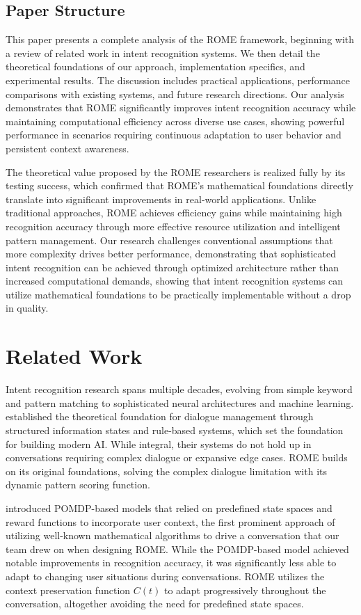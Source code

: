 \documentclass[12pt]{article}
\begin{document}
\subsection{Paper Structure}
This paper presents a complete analysis of the ROME framework, beginning with a review of related work in intent recognition systems. We then detail the theoretical foundations of our approach, implementation specifics, and experimental results. The discussion includes practical applications, performance comparisons with existing systems, and future research directions. Our analysis demonstrates that ROME significantly improves intent recognition accuracy while maintaining computational efficiency across diverse use cases, showing powerful performance in scenarios requiring continuous adaptation to user behavior and persistent context awareness.

The theoretical value proposed by the ROME researchers is realized fully by its testing success, which confirmed that ROME's mathematical foundations directly translate into significant improvements in real-world applications. Unlike traditional approaches, ROME achieves efficiency gains while maintaining high recognition accuracy through more effective resource utilization and intelligent pattern management. Our research challenges conventional assumptions that more complexity drives better performance, demonstrating that sophisticated intent recognition can be achieved through optimized architecture rather than increased computational demands, showing that intent recognition systems can utilize mathematical foundations to be practically implementable without a drop in quality.


\section{Related Work}
Intent recognition research spans multiple decades, evolving from simple keyword and pattern matching to sophisticated neural architectures and machine learning. \citet{larsson2000} established the theoretical foundation for dialogue management through structured information states and rule-based systems, which set the foundation for building modern AI. While integral, their systems do not hold up in conversations requiring complex dialogue or expansive edge cases. ROME builds on its original foundations, solving the complex dialogue limitation with its dynamic pattern scoring function.

\citet{young2013} introduced POMDP-based models that relied on predefined state spaces and reward functions to incorporate user context, the first prominent approach of utilizing well-known mathematical algorithms to drive a conversation that our team drew on when designing ROME. While the POMDP-based model achieved notable improvements in recognition accuracy, it was significantly less able to adapt to changing user situations during conversations. ROME utilizes the context preservation function $C(t)$ to adapt progressively throughout the conversation, altogether avoiding the need for predefined state spaces.
\end{document}
